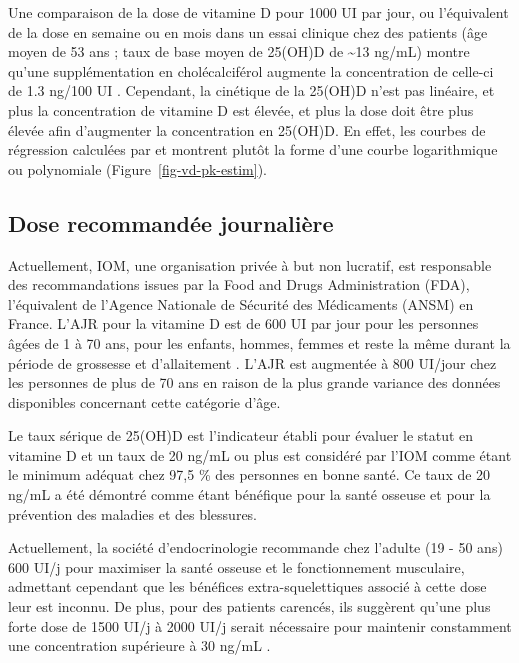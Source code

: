 \documentclass[
  a4paper,
  DIV=11,
  numbers=noendperiod,
  listof=totoc]{scrreprt}
\begin{document}
Une comparaison de la dose de vitamine D pour 1000 UI par jour, ou
l'équivalent de la dose en semaine ou en mois dans un essai clinique
chez des patients (âge moyen de 53 ans ; taux de base moyen de 25(OH)D
de \textasciitilde13 ng/mL) montre qu'une supplémentation en
cholécalciférol augmente la concentration de celle-ci de 1.3 ng/100 UI
\autocite{Bouillon.2017}. Cependant, la cinétique de la 25(OH)D n'est
pas linéaire, et plus la concentration de vitamine D est élevée, et plus
la dose doit être plus élevée afin d'augmenter la concentration en
25(OH)D. En effet, les courbes de régression calculées par
\textcite{Veugelers.2014} et \textcite{Heaney.2015} montrent plutôt la
forme d'une courbe logarithmique ou polynomiale
(Figure~\ref{fig-vd-pk-estim}).

\hypertarget{dose-recommanduxe9e-journaliuxe8re}{%
\subsection{Dose recommandée
journalière}\label{dose-recommanduxe9e-journaliuxe8re}}

Actuellement, \ac{IOM}, une organisation privée à but non lucratif, est
responsable des recommandations issues par la Food and Drugs
Administration (FDA), l'équivalent de l'Agence Nationale de Sécurité des
Médicaments (ANSM) en France. L'\ac{AJR} pour la vitamine D est de 600
UI par jour pour les personnes âgées de 1 à 70 ans, pour les enfants,
hommes, femmes et reste la même durant la période de grossesse et
d'allaitement \autocite[pp.~9]{IOM.2011.org}. L'AJR est augmentée à 800
UI/jour chez les personnes de plus de 70 ans en raison de la plus grande
variance des données disponibles concernant cette catégorie d'âge.

Le taux sérique de 25(OH)D est l'indicateur établi pour évaluer le
statut en vitamine D et un taux de 20 ng/mL ou plus est considéré par
l'IOM comme étant le minimum adéquat chez 97,5 \% des personnes en bonne
santé. Ce taux de 20 ng/mL a été démontré comme étant bénéfique pour la
santé osseuse et pour la prévention des maladies et des blessures.

Actuellement, la société d'endocrinologie recommande chez l'adulte (19 -
50 ans) 600 UI/j pour maximiser la santé osseuse et le fonctionnement
musculaire, admettant cependant que les bénéfices extra-squelettiques
associé à cette dose leur est inconnu. De plus, pour des patients
carencés, ils suggèrent qu'une plus forte dose de 1500 UI/j à 2000 UI/j
serait nécessaire pour maintenir constamment une concentration
supérieure à 30 ng/mL \autocite{Holick.2011}.
\end{document}
